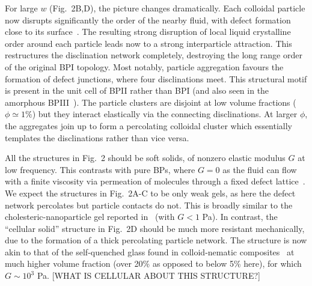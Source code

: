 \documentclass[12pt]{article}
\begin{document}
For large $w$ (Fig.~2B,D), the picture changes dramatically.
Each colloidal particle now disrupts significantly the order of the nearby fluid, with defect formation close to its surface~\cite{stark}. The resulting strong disruption of
local liquid crystalline order around each particle leads now to a 
strong interparticle attraction. This restructures the disclination
network completely, destroying the long range order of
the original BPI topology. Most notably, particle aggregation favours
the formation of defect junctions, where four disclinations meet. This structural motif is present in the unit cell of BPII rather than BPI (and also seen in the amorphous BPIII~\cite{bp3}). The 
particle clusters are disjoint at low volume fractions ($\phi\simeq 1\%$) but 
they interact elastically via the connecting disclinations. At larger $\phi$, the aggregates join up to form a percolating colloidal cluster which essentially templates the disclinations rather than vice versa. 

All the structures in Fig.~2 should be soft solids, of nonzero elastic modulus $G$ at low frequency. This contrasts with pure BPs, where
$G=0$ as the fluid can flow with a finite
viscosity via permeation of molecules through a fixed defect lattice~\cite{permeation1,permeation2}. We expect the
structures in Fig.~2A-C to be only weak gels, as here the 
defect network percolates but particle contacts do not. This is broadly similar to the cholesteric-nanoparticle gel reported
in~\cite{lubensky} (with $G<1$ Pa). In contrast, the ``cellular solid'' 
structure in Fig.~2D should be much more resistant mechanically, 
due to the formation of a thick percolating particle network. The 
structure is now akin to that of the self-quenched glass found in 
colloid-nematic composites~\cite{tiffany} at much higher volume 
fraction (over 20\% as opposed to below 5\% here), for which $G\sim 10^3$ Pa. [WHAT IS CELLULAR ABOUT THIS STRUCTURE?]
\end{document}
